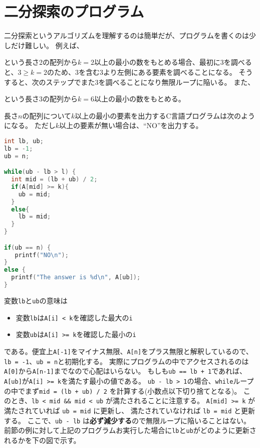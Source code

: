 \documentclass[a4paper,twoside,onecolumn,openany,article,10pt]{memoir}
\theoremstyle{remark}
\begin{document}
\section{二分探索のプログラム}
二分探索というアルゴリズムを理解するのは簡単だが、プログラムを書くのは少しだけ難しい。
例えば、
\begin{center}
\end{center}
という長さ2の配列から$k=2$以上の最小の数をもとめる場合、最初に3を調べると、$3\ge k=2$のため、3を含む3より左側にある要素を調べることになる。
そうすると、次のステップでまた3を調べることになり無限ループに陥いる。
また、
\begin{center}
\end{center}
という長さ3の配列から$k=6$以上の最小の数をもとめる。
\fi

長さ$n$の配列について$k$以上の最小の要素を出力するC言語プログラムは次のようになる。
ただし$k$以上の要素が無い場合は、``NO''を出力する。

\begin{lstlisting}[basicstyle=\ttfamily\small,showstringspaces=false,language=C,frame=single]
int lb, ub;
lb = -1;
ub = n;

while(ub - lb > l) {
  int mid = (lb + ub) / 2;
  if(A[mid] >= k){
    ub = mid;
  }
  else{
    lb = mid;
  }
}

if(ub == n) {
   printf("NO\n");
}
else {
  printf("The answer is %d\n", A[ub]);
}
\end{lstlisting}
変数\texttt{lb}と\texttt{ub}の意味は
\begin{itemize}
\item 変数\texttt{lb}は\texttt{A[i] < k}を確認した最大の\texttt{i}
\item 変数\texttt{ub}は\texttt{A[i] >= k}を確認した最小の\texttt{i}
\end{itemize}
である。便宜上\texttt{A[-1]}をマイナス無限、\texttt{A[n]}をプラス無限と解釈しているので、\texttt{lb = -1}、\texttt{ub = n}と初期化する。
実際にプログラムの中でアクセスされるのは\texttt{A[0]}から\texttt{A[n-1]}までなので心配はいらない。
もしも\texttt{ub == lb + 1}であれば、\texttt{A[ub]}が\texttt{A[i] >= k}を満たす最小の値である。
\texttt{ub - lb > 1}の場合、\texttt{while}ループの中でまず\texttt{mid = (lb + ub) / 2} を計算する(小数点以下切り捨てとなる)。
このとき、\texttt{lb < mid \&\& mid < ub} が満たされることに注意する。
\texttt{A[mid] >= k} が満たされていれば \texttt{ub = mid} に更新し、
満たされていなければ \texttt{lb = mid} と更新する。
ここで、\texttt{ub - lb} は\textbf{必ず減少する}ので無限ループに陥いることはない。
前節の例に対して上記のプログラムお実行した場合に\texttt{lb}と\texttt{ub}がどのように更新されるかを下の図で示す。
\end{document}
